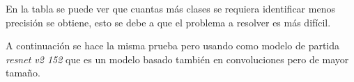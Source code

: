 \documentclass[12pt,a4paper]{article}
\begin{document}
\begin{table}[H]
\centering
{}
\caption{Resultados añadir una capa totalmente conectada y \textit{softmax}.}
\end{table}

En la tabla se puede ver que cuantas más clases se requiera identificar menos precisión se obtiene, esto se debe a que el problema a resolver es más difícil.
\bigskip

A continuación se hace la misma prueba pero usando como modelo de partida \textit{resnet v2 152} que es un modelo basado también en convoluciones pero de mayor tamaño.
\end{document}

